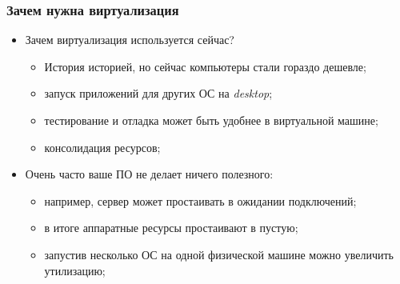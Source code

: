 \begin{frame}
\frametitle{Зачем нужна виртуализация}
\begin{itemize}
  \item<1-> Зачем виртуализация используется сейчас?
    \begin{itemize}
      \item История историей, но сейчас компьютеры стали гораздо дешевле;
      \item запуск приложений для других ОС на \emph{desktop};
      \item тестирование и отладка может быть удобнее в виртуальной машине;
      \item консолидация ресурсов;
    \end{itemize}
  \item<2-> Очень часто ваше ПО не делает ничего полезного:
    \begin{itemize}
      \item например, сервер может простаивать в ожидании подключений;
      \item в итоге аппаратные ресурсы простаивают в пустую;
      \item запустив несколько ОС на одной физической машине можно увеличить
            утилизацию;
    \end{itemize}
\end{itemize}
\end{frame}
